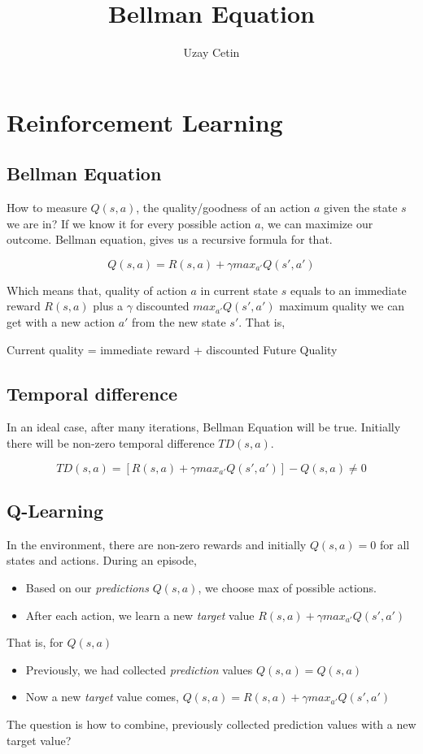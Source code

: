 \documentclass[11pt]{amsart}
\title{Bellman Equation}
\author{Uzay Cetin}
\begin{document}
\maketitle
\section{Reinforcement Learning}

\subsection{Bellman Equation}
How to measure $Q(s,a)$, the quality/goodness of an action $a$ given the state $s$ we are in? If we know it for every possible action $a$, we can maximize our outcome. Bellman equation, gives us a recursive formula for that.

$$Q(s,a) = R(s,a) + \gamma max_{a'} Q(s',a')$$

Which means that, quality of action $a$ in current state $s$ equals to an immediate reward $R(s,a)$ plus a $\gamma$ discounted $max_{a'} Q(s',a')$ maximum quality we can get with a new action $a'$ from the new state $s'$. That is,

\begin{center}
Current quality = immediate reward + discounted Future Quality 
\end{center}

\subsection{Temporal difference}
In an ideal case, after many iterations, Bellman Equation will be true. Initially there will be non-zero temporal difference $TD(s,a)$.

$$TD(s,a) = [R(s,a) + \gamma max_{a'} Q(s',a')] - Q(s,a) \neq 0$$

\subsection{Q-Learning}
In the environment, there are non-zero rewards and initially $Q(s,a) = 0$ for all states and actions. During an episode,
\begin{itemize}
	\item Based on our \emph{predictions} $Q(s,a)$, we choose max of possible actions. 
	\item After each action, we learn a new \emph{target} value $R(s,a) + \gamma max_{a'} Q(s',a')$
\end{itemize}
That is, for $Q(s,a)$ 
\begin{itemize}
	\item Previously, we had collected \emph{prediction} values $Q(s,a) = Q(s,a) $ 
	\item Now a new \emph{target} value comes, $Q(s,a) = R(s,a) + \gamma max_{a'} Q(s',a')$
\end{itemize}
The question is how to combine, previously collected prediction values with a new target value?
\end{document}
